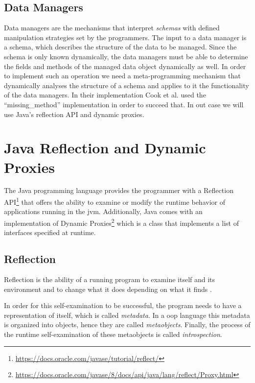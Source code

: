 \subsection{Data Managers}\label{Data Managers}
Data managers are the mechanisms that interpret \textit{schemas} with defined manipulation strategies set by the programmers. 
The input to a data manager is a schema, which describes the structure of the data to be managed.
Since the schema is only known dynamically, the data managers must be able to determine the fields and methods of the managed data object dynamically as well.
In order to implement such an operation we need a meta-programming mechanism that dynamically analyses the structure of a schema and applies to it the functionality of the data managers.
In their implementation Cook et al. \cite{loh2012managed} used the ``missing\_method'' implementation in order to succeed that.
In out case we will use Java's reflection API and dynamic proxies.

\section{Java Reflection and Dynamic Proxies}\label{Java Reflection and Dynamic Proxies}
The Java programming language provides the programmer with a Reflection API\footnote{\url{https://docs.oracle.com/javase/tutorial/reflect/}} that offers the ability to examine or modify the runtime behavior of applications running in the \ac{jvm}. 
Additionally, Java comes with an implementation of Dynamic Proxies\footnote{\url{https://docs.oracle.com/javase/8/docs/api/java/lang/reflect/Proxy.html}} which is a class that implements a list of interfaces specified at runtime.

\subsection{Reflection}\label{Reflection}

Reflection is the ability of a running program to examine itself and its environment and to change what it does depending on what it finds \cite{forman2004java}.

In order for this self-examination to be successful, the program needs to have a representation of itself, which is called \textit{metadata}.
In a \ac{oop} language this metadata is organized into objects, hence they are called \textit{metaobjects}. 
Finally, the process of the runtime self-examination of these metaobjects is called \textit{introspection}.

